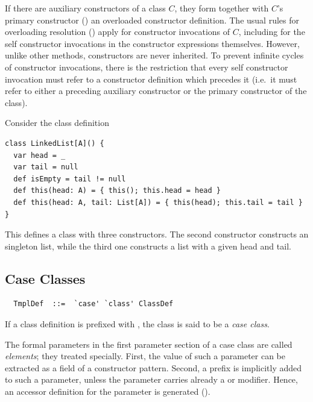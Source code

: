 If there are auxiliary constructors of a class $C$, they form together
with $C$'s primary constructor ()
an overloaded constructor
definition. The usual rules for overloading resolution
() apply for constructor invocations of $C$,
including for the self constructor invocations in the constructor
expressions themselves. However, unlike other methods, constructors
are never inherited.  To prevent infinite cycles of constructor
invocations, there is the restriction that every self constructor
invocation must refer to a constructor definition which precedes it
(i.e.\ it must refer to either a preceding auxiliary constructor or the
primary constructor of the class).  

\example Consider the class definition

\begin{lstlisting}
class LinkedList[A]() {
  var head = _ 
  var tail = null 
  def isEmpty = tail != null   
  def this(head: A) = { this(); this.head = head }
  def this(head: A, tail: List[A]) = { this(head); this.tail = tail }
}
\end{lstlisting}
This defines a class  with three constructors.  The
second constructor constructs an singleton list, while the
third one constructs a list with a given head and tail.

\subsection{Case Classes}
\label{sec:case-classes}

\syntax\begin{lstlisting} 
  TmplDef  ::=  `case' `class' ClassDef
\end{lstlisting}

If a class definition is prefixed with , the class is said
to be a {\em case class}.  

The formal parameters in the first parameter section of a case class
are called {\em elements}; they treated
specially. First, the value of such a parameter can be extracted as a
field of a constructor pattern. Second, a  prefix is
implicitly added to such a parameter, unless the parameter carries
already a  or  modifier. Hence, an accessor
definition for the parameter is generated ().

